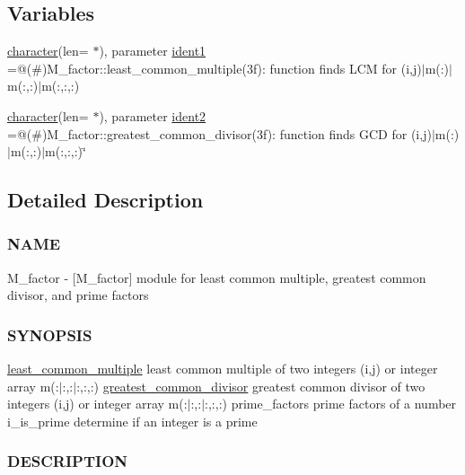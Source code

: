 \subsection*{Variables}
\begin{DoxyCompactItemize}
\item 
\hyperlink{option__stopwatch_83_8txt_abd4b21fbbd175834027b5224bfe97e66}{character}(len= $\ast$), parameter \hyperlink{namespacem__factor_a7ae228777d43741d83e3a4df917f39df}{ident1} =\textquotesingle{}@(\#)M\+\_\+factor\+::least\+\_\+common\+\_\+multiple(3f)\+: function finds L\+C\+M for (i,j)$\vert$m(\+:)$\vert$m(\+:,\+:)$\vert$m(\+:,\+:,\+:)\textquotesingle{}
\item 
\hyperlink{option__stopwatch_83_8txt_abd4b21fbbd175834027b5224bfe97e66}{character}(len= $\ast$), parameter \hyperlink{namespacem__factor_ab34da44c20883bea1b31a67a3d6359e5}{ident2} =\textquotesingle{}@(\#)M\+\_\+factor\+::greatest\+\_\+common\+\_\+divisor(3f)\+: function finds G\+C\+D for (i,j)$\vert$m(\+:)$\vert$m(\+:,\+:)$\vert$m(\+:,\+:,\+:)\char`\"{}\textquotesingle{}
\end{DoxyCompactItemize}


\subsection{Detailed Description}
\subsubsection*{N\+A\+ME}

M\+\_\+factor -\/ \mbox{[}M\+\_\+factor\mbox{]} module for least common multiple, greatest common divisor, and prime factors \subsubsection*{S\+Y\+N\+O\+P\+S\+IS}

\hyperlink{interfacem__factor_1_1least__common__multiple}{least\+\_\+common\+\_\+multiple} least common multiple of two integers (i,j) or integer array m(\+:$\vert$\+:,\+:$\vert$\+:,\+:,\+:) \hyperlink{interfacem__factor_1_1greatest__common__divisor}{greatest\+\_\+common\+\_\+divisor} greatest common divisor of two integers (i,j) or integer array m(\+:$\vert$\+:,\+:$\vert$\+:,\+:,\+:) prime\+\_\+factors prime factors of a number i\+\_\+is\+\_\+prime determine if an integer is a prime

\subsubsection*{D\+E\+S\+C\+R\+I\+P\+T\+I\+ON}


